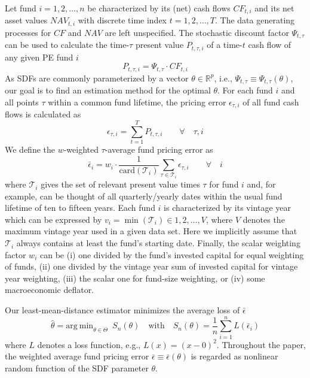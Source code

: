 \documentclass[12pt]{article}
\begin{document}
Let fund $i=1,2,\dots,n$ be characterized by its (net) cash flows ${CF}_{t,i}$ and its net asset values ${NAV}_{t,i}$ with discrete time index $t=1,2,\dots,T$.
The data generating processes for $CF$ and $NAV$ are left unspecified.
The stochastic discount factor $\Psi_{t,\tau}$ can be used to calculate the time-$\tau$ present value $P_{t,\tau,i}$ of a time-$t$ cash flow of any given PE fund $i$
\begin{equation}
\label{eq:price}
P_{t,\tau,i} = \Psi_{t,\tau} \cdot CF_{t,i}
\end{equation}
As SDFs are commonly parameterized by a vector $\theta \in \mathbb{R}^p$, i.e., $\Psi_{t,\tau} \equiv \Psi_{t,\tau} (\theta)$, our goal is to find an estimation method for the optimal $\theta$.
For each fund $i$ and all points $\tau$ within a common fund lifetime, the pricing error $\epsilon_{\tau,i}$ of all fund cash flows is calculated as
\begin{equation}
\label{eq:pricing_error}
\epsilon_{\tau,i} = \sum_{t=1}^T P_{t,\tau,i} 
\qquad \forall \quad \tau,i
\end{equation}
We define the $w$-weighted $\tau$-average fund pricing error as
\begin{equation}
\label{eq:average_pricing_error}
\bar{\epsilon}_{i} =
w_{i} \cdot
\frac{1}{\mathrm{card}( \mathcal{T}_{i})}
\sum_{\tau \in \mathcal{T}_{i}}
\epsilon_{\tau,i}
\qquad \forall \quad i
\end{equation}
where $\mathcal{T}_i$ gives the set of relevant present value times $\tau$ for fund $i$ and, for example, can be thought of all quarterly/yearly dates within the usual fund lifetime of ten to fifteen years.
Each fund $i$ is characterized by its vintage year which can be expressed by $v_{i}=\min(\mathcal{T}_i) \in 1,2,\dots,V$, where $V$ denotes the maximum vintage year used in a given data set.
Here we implicitly assume that $\mathcal{T}_i$ always contains at least the fund's starting date.
Finally, the scalar weighting factor $w_i$ can be (i) one divided by the fund's invested capital for equal weighting of funds, (ii) one divided by the vintage year sum of invested capital for vintage year weighting, (iii) the scalar one for fund-size weighting, or (iv) some macroeconomic deflator.

Our least-mean-distance estimator minimizes the average loss of $\bar{\epsilon}$
\begin{equation}
\label{eq:estimator}
\hat{\theta} = 
\mathrm{arg \ min}_{\theta \in \Theta}
\enspace
S_n(\theta)
\quad
\mathrm{with}
\quad
S_n(\theta) = 
\frac{1}{n}
\sum_{i=1}^n
L \left( \bar{\epsilon}_{i} \right) 
\end{equation}
where $L$ denotes a loss function, e.g., $L(x)=(x-0)^2$.
Throughout the paper, the weighted average fund pricing error $\bar{\epsilon} \equiv \bar{\epsilon}(\theta)$ is regarded as nonlinear random function of the SDF parameter $\theta$.
\end{document}
